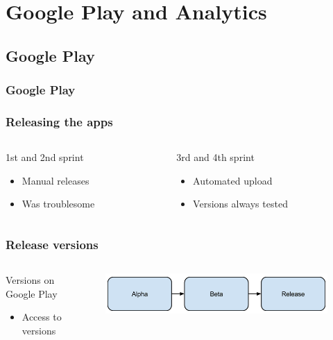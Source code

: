 \section{Google Play and Analytics}
\subsection{Google Play}
\begin{frame}
	\frametitle{Google Play}
\end{frame}

\begin{frame}
	\begin{center}
		\frametitle{Releasing the apps}
		\begin{columns} %
			\begin{column}{.3\textwidth}
				1st and 2nd sprint
				\begin{itemize}
					\item Manual releases
					\item Was troublesome
				\end{itemize}
			\end{column}%
			\begin{column}{.3\textwidth}
				3rd and 4th sprint
				\begin{itemize}
					\item Automated upload
					\item Versions always tested
				\end{itemize}
			\end{column}%
	\end{columns}
	\end{center}
\end{frame}

\begin{frame}
	\begin{center}
		\frametitle{Release versions}
		\begin{columns} %
			\begin{column}{.3\textwidth}
				Versions on Google Play
				\begin{itemize}
					\item Access to versions
				\end{itemize}
			\end{column}%
			\begin{column}{.80\textwidth}
				\begin{figure}[H]
					\centering
					\includegraphics[width= 0.8 \textwidth]{pictures/Versions.png}
				\end{figure}
			\end{column}%
		\end{columns}
	\end{center}
\end{frame}

